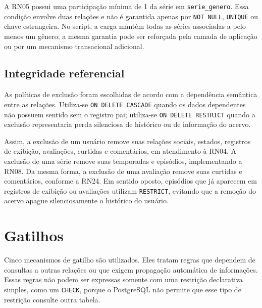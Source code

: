 \documentclass[a4paper,12pt,oneside,openany]{book}
\newcommand{\id}[1]{\texttt{#1}}
\begin{document}
A RN05 possui uma participação mínima de 1 da série em \id{serie\_genero}.
Essa condição envolve duas relações e não é garantida apenas por
\id{NOT NULL}, \id{UNIQUE} ou chave estrangeira. No script, a carga mantém todas
as séries associadas a pelo menos um gênero; a mesma garantia pode ser reforçada
pela camada de aplicação ou por um mecanismo transacional adicional.

\subsection*{Integridade referencial}

As políticas de exclusão foram escolhidas de acordo com a dependência semântica
entre as relações. Utiliza-se \id{ON DELETE CASCADE} quando os dados dependentes
não possuem sentido sem o registro pai; utiliza-se \id{ON DELETE RESTRICT} quando
a exclusão representaria perda silenciosa de histórico ou de informação do
acervo.

Assim, a exclusão de um usuário remove suas relações sociais, estados,
registros de exibição, avaliações, curtidas e comentários, em atendimento à
RN04. A exclusão de uma série remove suas temporadas e episódios, implementando
a RN08. Da mesma forma, a exclusão de uma avaliação remove suas curtidas e
comentários, conforme a RN24. Em sentido oposto, episódios que já aparecem em
registros de exibição ou avaliações utilizam \id{RESTRICT}, evitando que a
remoção do acervo apague silenciosamente o histórico do usuário.

\section{Gatilhos}\label{sec:gatilhos}

Cinco mecanismos de gatilho são utilizados. Eles tratam regras que dependem de
consultas a outras relações ou que exigem propagação automática de informações.
Essas regras não podem ser expressas somente com uma restrição declarativa
simples, como um \id{CHECK}, porque o PostgreSQL não permite que esse tipo de
restrição consulte outra tabela.
\end{document}
